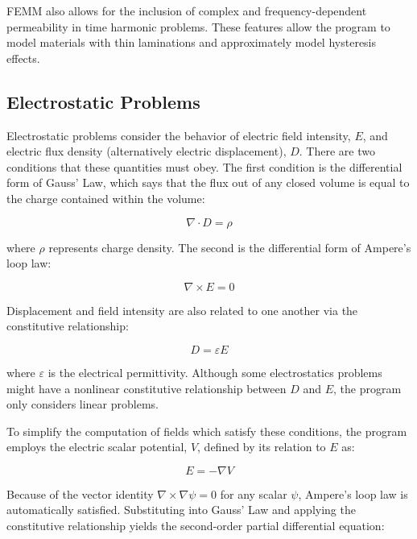 \documentclass[12pt]{report}
\begin{document}
FEMM also allows for the inclusion of complex and frequency-dependent permeability in time harmonic problems.
These features allow the program to model materials with thin laminations and approximately model hysteresis
effects.

\subsection{Electrostatic Problems}

Electrostatic problems consider the behavior of electric field
intensity, $E$, and electric flux density (alternatively electric
displacement), $D$. There are two conditions that these quantities
must obey. The first condition is the differential form of Gauss'
Law, which says that the flux out of any closed volume is equal to
the charge contained within the volume:

\begin{equation}
\label{eq1}
\nabla \cdot D = \rho
\end{equation}

\noindent
where \textit{$\rho $} represents charge density. The second is the
differential form of Ampere's loop law:

\begin{equation}
\label{eq2}
\nabla \times E = 0
\end{equation}

\noindent
Displacement and field intensity are also related to one another via the
constitutive relationship:

\begin{equation}
\label{eq3}
D = \varepsilon E
\end{equation}

\noindent
where \textit{$\varepsilon $} is the electrical permittivity. Although some electrostatics problems
might have a nonlinear constitutive relationship between $D$ and $E$, the program only
considers linear problems.

To simplify the computation of fields which satisfy these conditions,
the program employs the electric scalar potential, $V$, defined by its relation to $E$ as:

\begin{equation}
\label{eq4}
E = - \nabla V
\end{equation}

Because of the vector identity $\nabla \times \nabla \psi = 0$ for any
scalar \textit{$\psi $}, Ampere's loop law is automatically satisfied. Substituting into
Gauss' Law and applying the constitutive relationship yields the
second-order partial differential equation:
\end{document}
